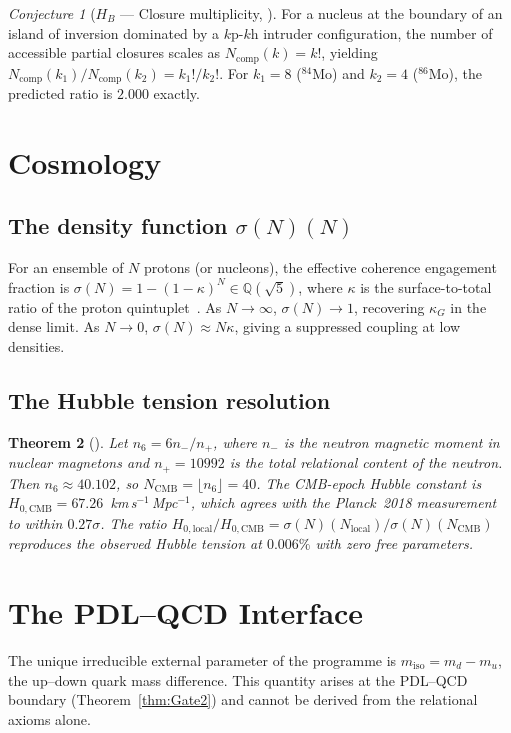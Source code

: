 \documentclass[11pt,a4paper]{article}
\theoremstyle{plain}
\newtheorem{theorem}{Theorem}[section]
\theoremstyle{definition}
\theoremstyle{remark}
\newtheorem{conjecture}[theorem]{Conjecture}
\newcommand{\sigmaN}{\sigma(N)}
\begin{document}
\begin{conjecture}[$H_B$ --- Closure multiplicity, \cite{D41}]
\label{conj:HB}
For a nucleus at the boundary of an island of inversion dominated by a $k$p-$k$h intruder configuration, the number of accessible partial closures scales as $N_{\mathrm{comp}}(k)=k!$, yielding $N_{\mathrm{comp}}(k_1)/N_{\mathrm{comp}}(k_2)=k_1!/k_2!$. For $k_1=8$ ($^{84}$Mo) and $k_2=4$ ($^{86}$Mo), the predicted ratio is $2.000$ exactly.
\end{conjecture}

\section{Cosmology}
\label{sec:cosmology}

\subsection{The density function \texorpdfstring{$\sigmaN(N)$}{sigmaN(N)}}
\label{subsec:sigma}
For an ensemble of $N$ protons (or nucleons), the effective coherence engagement fraction is $\sigmaN=1-(1-\kappa)^N\in\mathbb{Q}(\sqrt{5})$, where $\kappa$ is the surface-to-total ratio of the proton quintuplet~\cite{D24,D26}. As $N\to\infty$, $\sigmaN\to 1$, recovering $\kappa_G$ in the dense limit. As $N\to0$, $\sigmaN\approx N\kappa$, giving a suppressed coupling at low densities.

\subsection{The Hubble tension resolution}
\label{subsec:hubble}
\begin{theorem}[\cite{D27,D35}]
\label{thm:hubble}
Let $n_6=6n_-/n_+$, where $n_-$ is the neutron magnetic moment in nuclear magnetons and $n_{+}=10992$ is the total relational content of the neutron. Then $n_6\approx 40.102$, so $N_{\mathrm{CMB}}=\lfloor n_6\rfloor=40$. The CMB-epoch Hubble constant is $H_{0,\mathrm{CMB}}=67.26$~km\,s$^{-1}$\,Mpc$^{-1}$, which agrees with the Planck~2018 measurement to within $0.27\sigma$. The ratio $H_{0,\mathrm{local}}/H_{0,\mathrm{CMB}}=\sigmaN(N_{\mathrm{local}})/\sigmaN(N_{\mathrm{CMB}})$ reproduces the observed Hubble tension at $0.006\%$ with zero free parameters.
\end{theorem}

\section{The PDL--QCD Interface}
\label{sec:QCD}
The unique irreducible external parameter of the programme is $m_{\mathrm{iso}}=m_d-m_u$, the up--down quark mass difference. This quantity arises at the PDL--QCD boundary (Theorem~\ref{thm:Gate2}) and cannot be derived from the relational axioms alone.
\end{document}
